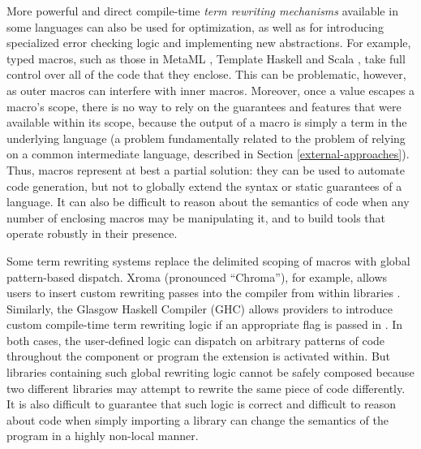 More powerful and direct compile-time \emph{term rewriting mechanisms} available in some languages can also be used for optimization, as well as for introducing specialized error checking logic and implementing new abstractions. For example, typed macros, such as those in MetaML \cite{Sheard:1999:UMS}, Template Haskell \cite{SheardPeytonJones:Haskell-02} and Scala \cite{scala-macros}, take full control over all of the code that they enclose. This can be problematic, however, as outer macros can interfere with inner macros. Moreover, once a value escapes a macro's scope, there is no way to rely on the guarantees and features that were available within its scope, because the output of a macro is simply a term in the underlying language (a problem fundamentally related to the problem of relying on a common intermediate language,  described in Section \ref{external-approaches}). Thus, macros represent at best a partial solution: they can be used to automate code generation, but not to globally extend the syntax or static guarantees of a language. It can also be difficult to reason about the semantics of code when any number of enclosing macros may be manipulating it, and to build tools that operate robustly in their presence.

Some term rewriting systems replace the delimited scoping of macros with global pattern-based dispatch. Xroma (pronounced ``Chroma''), for example, allows users to insert custom rewriting passes into the compiler from within libraries \cite{activelibraries}. Similarly, the Glasgow Haskell Compiler (GHC) allows providers to introduce custom compile-time term rewriting logic if an appropriate flag is passed in \cite{jones2001playing}. In both cases, the user-defined logic can dispatch on arbitrary patterns of code throughout the component or program the extension is activated within. But libraries containing such global rewriting logic cannot be safely composed because two different libraries may attempt to rewrite the same piece of code differently. It is also difficult to guarantee that such logic is correct and difficult to reason about code when simply importing a library can change the semantics of the program in a highly non-local manner.

